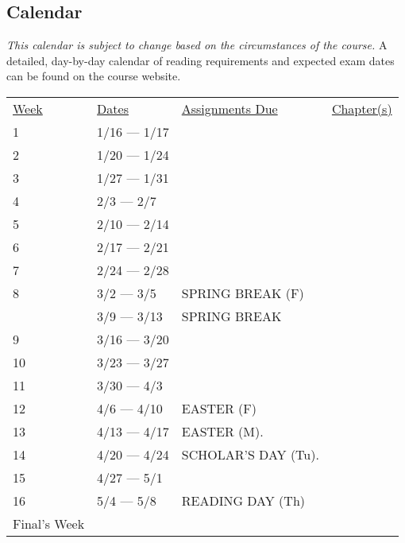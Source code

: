 \documentclass[10pt]{article}
\begin{document}
\subsection{Calendar}

\textit{This calendar is subject to change based on the circumstances of the course.} A detailed, day-by-day calendar of reading requirements and expected exam dates can be found on the course website.

\begin{center}
\begin{tabular}{llll}
\underline{Week} & \underline{Dates} & \underline{Assignments Due} & \underline{Chapter(s)}\\
1 & 1/16 --- 1/17 & &   \\
2 & 1/20 --- 1/24 &  &  \\
3 & 1/27 --- 1/31 & &  \\
4 & 2/3 --- 2/7 & &  \\
5 & 2/10 --- 2/14 & &\\
6 & 2/17 --- 2/21 & &  \\
7 & 2/24 --- 2/28 & &  \\
8 & 3/2 --- 3/5 &   SPRING BREAK (F) &\\
& 3/9 --- 3/13 &  SPRING BREAK & \\
9 & 3/16 --- 3/20 &  &\\
10 & 3/23 --- 3/27 & & \\
11 & 3/30 --- 4/3 & & \\
12 & 4/6 --- 4/10 & EASTER (F)  & \\
13 & 4/13 --- 4/17 & EASTER (M). & \\
14 & 4/20 --- 4/24 & SCHOLAR'S DAY (Tu).  & \\
15 & 4/27 --- 5/1 &  &  \\
16 & 5/4 --- 5/8 & READING DAY (Th) & \\
Final's Week &  &  &  \\
\end{tabular}
\end{center}
\end{document}
